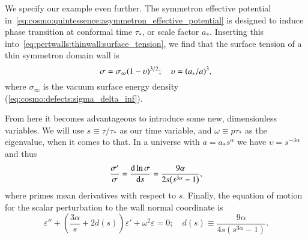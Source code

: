 




\newcommand{\eqregimenum}[1]{{\tiny{\textbf{(#1)}}}}






We specify our example even further. The symmetron effective potential in~\cref{eq:cosmo:quintessence:asymmetron_effective_potential} is designed to induce phase transition at conformal time $\tau_\ast$, or scale factor $a_\ast$. Inserting this into~\cref{eq:pertwalls:thinwall:surface_tension}, we find that the surface tension of a thin symmetron domain wall is
\begin{equation}
    \sigma = \sigma_\infty {\left( 1 -\upsilon  \right)}^{3/2}; \quad \upsilon={\left( a_\ast/a \right)}^3,
\end{equation}
where $\sigma_\infty$ is the vacuum surface energy density (\cref{eq:cosmo:defects:sigma_delta_inf}). 

From here it becomes advantageous to introduce some new, dimensionless variables. %
We will use $s\equiv \tau/\tau_\ast$ as our time variable, and $\omega \equiv p\tau_\ast$ as the eigenvalue, when it comes to that. In a universe with $a = a_\ast s^\alpha$ we have $\upsilon = s^{-3\alpha}$ and thus  %
\begin{equation}
    \frac{\sigma '}{\sigma} 
    = \dv{\ln{\sigma}}{s} = \frac{9\alpha}{2s{\left( s^{3\alpha} -1  \right)}},
\end{equation}
where primes mean derivatives with respect to $s$. %
Finally, the equation of motion for the scalar perturbation to the wall normal coordinate is
\begin{equation}\label{eq:pertwalls:mywalls:eom_final}
    \varepsilon'' + \left(  \frac{3\alpha}{s}  + 2 d(s)\right)\varepsilon' + \omega^2\varepsilon = 0; \quad d(s)\equiv \frac{9\alpha}{4 s \left( s^{3\alpha}-1 \right)}.
\end{equation}



